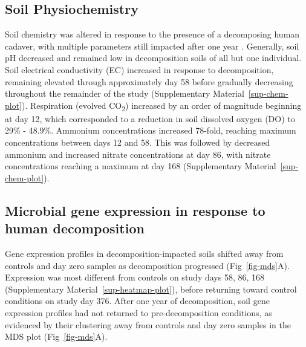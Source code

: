 \documentclass[
  sn-nature,
  lineno, referee]{sn-jnl}
\begin{document}
\subsection{Soil Physiochemistry}\label{soil-physiochemistry}

Soil chemistry was altered in response to the presence of a decomposing
human cadaver, with multiple parameters still impacted after one year
\citep{taylor_transient_2024}. Generally, soil pH decreased and remained
low in decomposition soils of all but one individual. Soil electrical
conductivity (EC) increased in response to decomposition, remaining
elevated through approximately day 58 before gradually decreasing
throughout the remainder of the study
(Supplementary Material~\ref{sup-chem-plot}). Respiration (evolved
CO\textsubscript{2}) increased by an order of magnitude beginning at day
12, which corresponded to a reduction in soil dissolved oxygen (DO) to
29\% - 48.9\%. Ammonium concentrations increased 78-fold, reaching
maximum concentrations between days 12 and 58. This was followed by
decreased ammonium and increased nitrate concentrations at day 86, with
nitrate concentrations reaching a maximum at day 168
(Supplementary Material~\ref{sup-chem-plot}).

\subsection{Microbial gene expression in response to human
decomposition}\label{microbial-gene-expression-in-response-to-human-decomposition}

Gene expression profiles in decomposition-impacted soils shifted away
from controls and day zero samples as decomposition progressed
(Fig~\ref{fig-mds}A). Expression was most different from controls on
study days 58, 86, 168 (Supplementary Material~\ref{sup-heatmap-plot}),
before returning toward control conditions on study day 376. After one
year of decomposition, soil gene expression profiles had not returned to
pre-decomposition conditions, as evidenced by their clustering away from
controls and day zero samples in the MDS plot (Fig~\ref{fig-mds}A).
\end{document}
